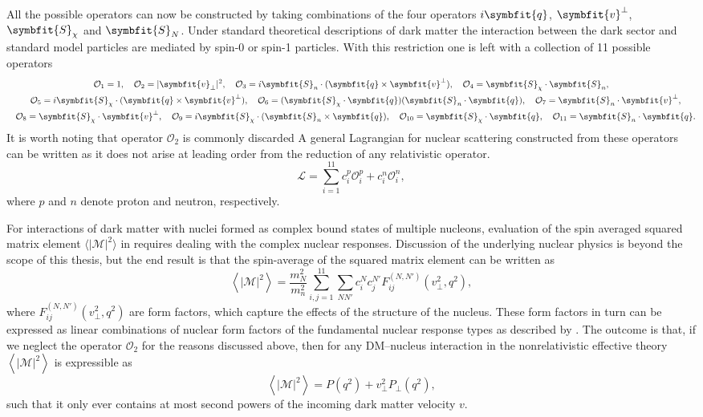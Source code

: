 \documentclass[b5paper, 10pt, twoside]{book}
\renewcommand{\vec}[1]{\symbfit{#1}}
\newcommand{\mean}[1]{\left\langle#1\right\rangle}
\newcommand{\tmean}[1]{\langle#1\rangle}
\begin{document}
All the possible operators can now be constructed by taking combinations of the four operators $i\vec{q}$, $\vec{v}^\perp$, $\vec{S}_\chi$ and $\vec{S}_N$. Under standard theoretical descriptions of dark matter the interaction between the dark sector and standard model particles are mediated by spin-0 or spin-1 particles. With this restriction one is left with a collection of 11 possible operators
\begin{gather*}
\mathcal{O}_1=1,\quad\mathcal{O}_2=|\vec{v}_\perp|^2,\quad\mathcal{O}_3=i\vec{S}_n\cdot(\vec{q}\times\vec{v}^\perp),\quad\mathcal{O}_4=\vec{S}_\chi\cdot\vec{S}_n,\\
\quad\mathcal{O}_5=i\vec{S}_\chi\cdot(\vec{q}\times\vec{v}^\perp),\quad\mathcal{O}_6=(\vec{S}_\chi\cdot\vec{q})(\vec{S}_n\cdot\vec{q}),\quad\mathcal{O}_7=\vec{S}_n\cdot\vec{v}^\perp,\\
\quad\mathcal{O}_8=\vec{S}_\chi\cdot\vec{v}^\perp,\quad\mathcal{O}_9=i\vec{S}_\chi\cdot(\vec{S}_n\times\vec{q}),\quad\mathcal{O}_{10}=\vec{S}_\chi\cdot\vec{q},\quad\mathcal{O}_{11}=\vec{S}_n\cdot\vec{q}.
\end{gather*}
It is worth noting that operator $\mathcal{O}_2$ is commonly discarded A general Lagrangian for nuclear scattering constructed from these operators can be written as it does not arise at leading order from the reduction of any relativistic operator.
\begin{equation}
\mathcal{L}=\sum_{i=1}^{11}c_i^p\mathcal{O}_i^p+c_i^n\mathcal{O}_i^n,
\end{equation}
where $p$ and $n$ denote proton and neutron, respectively.

For interactions of dark matter with nuclei formed as complex bound states of multiple nucleons, evaluation of the spin averaged squared matrix element $\tmean{|\mathcal{M}|^2}$ in requires dealing with the complex nuclear responses. Discussion of the underlying nuclear physics is beyond the scope of this thesis, but the end result is that the spin-average of the squared matrix element can be written as
\begin{equation}
\mean{|\mathcal{M}|^2}=\frac{m_N^2}{m_n^2}\sum_{i,j=1}^{11}\sum_{NN'}c_i^Nc_j^{N'}F_{ij}^{(N,N')}(v_\perp^2,q^2),
\end{equation}
where $F_{ij}^{(N,N')}(v_\perp^2,q^2)$ are form factors, which capture the effects of the structure of the nucleus. These form factors in turn can be expressed as linear combinations of nuclear form factors of the fundamental nuclear response types as described by \textcite{FitzpatrickEtAl2013}. The outcome is that, if we neglect the operator $\mathcal{O}_2$ for the reasons discussed above, then for any DM--nucleus interaction in the nonrelativistic effective theory $\mean{|\mathcal{M}|^2}$ is expressible as
\begin{equation}
\mean{|\mathcal{M}|^2}=P(q^2)+v_\perp^2P_\perp(q^2),
\label{eq:eft-amplitude-square}
\end{equation}
such that it only ever contains at most second powers of the incoming dark matter velocity $v$.
\end{document}
